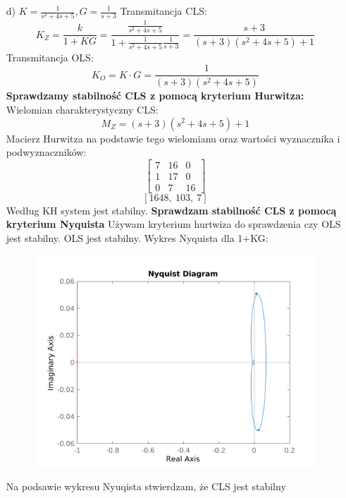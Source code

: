 \documentclass{article}
\begin{document}
\begin{itemize}
    \item[d)] $K=\frac{1}{s^{2} + 4 s + 5}, G=\frac{1}{s + 3}$
    Transmitancja CLS:
    $$K_Z=\frac{k}{1+KG}=\frac{\frac{1}{s^{2} + 4 s + 5}}{1+\frac{1}{s^{2} + 4 s + 5}\frac{1}{s + 3}}=\frac{s + 3}{\left(s + 3\right) \left(s^{2} + 4 s + 5\right) + 1}$$
    Transmitancja OLS:
    $$K_O=K\cdot G=\frac{1}{\left(s + 3\right) \left(s^{2} + 4 s + 5\right)}$$
    \textbf{Sprawdzamy stabilność CLS z pomocą kryterium Hurwitza:}\newline
    Wielomian charakterystyczny CLS:
    $$M_Z=\left(s + 3\right) \left(s^{2} + 4 s + 5\right) + 1$$
    Macierz Hurwitza na podstawie tego wielomianu oraz wartości wyznacznika i podwyznaczników:
    $$\left[\begin{matrix}7 & 16 & 0\\1 & 17 & 0\\0 & 7 & 16\end{matrix}\right]$$
    $$\left[ 1648, \  103, \  7\right]$$
    Według KH system jest stabilny.
    \newline\textbf{Sprawdzam stabilność CLS z pomocą kryterium Nyquista}\newline
    Używam kryterium hurtwiza do sprawdzenia czy OLS jest stabilny. OLS jest stabilny.
    Wykres Nyquista dla 1+KG:
    \begin{figure}
        \includegraphics[scale=0.8]{d.png}
    \end{figure}
    Na podsawie wykresu Nyuqista stwierdzam, że CLS jest stabilny
    \newpage            

\end{itemize}
\end{document}

